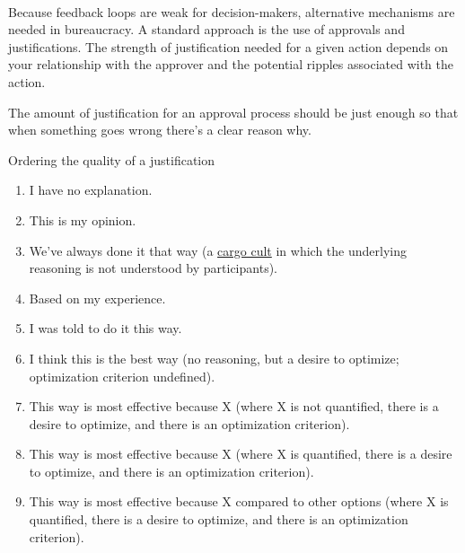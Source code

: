 \ \\


Because feedback loops are weak for decision-makers, alternative mechanisms are needed in bureaucracy. A standard approach is the use of approvals and justifications. The strength of justification needed for a given action depends on your relationship with the approver and the potential ripples associated with the action. 

The amount of justification for an approval process should be just enough so that when something goes wrong there's a clear reason why. 

Ordering the quality of a justification
\begin{enumerate}
    \item I have no explanation.
    \item This is my opinion.
    \item We've always done it that way (a \href{https://en.wikipedia.org/wiki/Cargo_cult}{cargo cult} in which the underlying reasoning is not understood by participants).
    \iftoggle{WPinmargin}{\marginpar{$>$Wikipedia: Cargo cult}}{}
    \item Based on my experience.
    \item I was told to do it this way.
    \item I think this is the best way (no reasoning, but a desire to optimize; optimization criterion undefined).
    \item This way is most effective because X (where X is not quantified, there is a desire to optimize, and there is an optimization criterion).
    \item This way is most effective because X (where X is quantified, there is a desire to optimize, and there is an optimization criterion).
    \item This way is most effective because X compared to other options (where X is quantified, there is a desire to optimize, and there is an optimization criterion).
\end{enumerate}


\ \\



